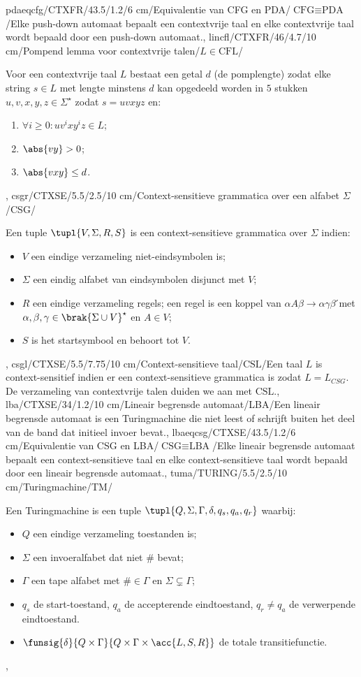 pdaeqcfg/CTXFR/43.5/1.2/6 cm/Equivalentie van CFG en PDA/$\mbox{CFG}\equiv\mbox{PDA}$/{Elke push-down automaat bepaalt een contextvrije taal en elke contextvrije taal wordt bepaald door een push-down automaat.},
lincfl/CTXFR/46/4.7/10 cm/Pompend lemma voor contextvrije talen/$L\in\mbox{CFL}$/{Voor een contextvrije taal $L$ bestaat een getal $d$ (de pomplengte) zodat elke string $s\in L$ met lengte minstens $d$ kan opgedeeld worden in $5$ stukken $u,v,x,y,z\in\Sigma^{\star}$ zodat $s=uvxyz$ en:
\begin{enumerate}
 \item $\forall i\geq 0:uv^ixy^iz\in L$;
 \item $\abs{vy}>0$;
 \item $\abs{vxy}\leq d$.
\end{enumerate}},
csgr/CTXSE/5.5/2.5/10 cm/Context-sensitieve grammatica over een alfabet $\Sigma$/CSG/{Een tuple $\tupl{V,\Sigma,R,S}$ is een context-sensitieve grammatica over $\Sigma$ indien:\begin{itemize}
 \item $V$ een eindige verzameling niet-eindsymbolen is;
 \item $\Sigma$ een eindig alfabet van eindsymbolen disjunct met $V$;
 \item $R$ een eindige verzameling regels; een regel is een koppel van $\alpha A\beta\rightarrow\alpha\gamma\beta$ ́met $\alpha,\beta,\gamma\in\brak{\Sigma\cup V}^{\star}$ en $A\in V$;
 \item $S$ is het startsymbool en behoort tot $V$.
\end{itemize}},
csgl/CTXSE/5.5/7.75/10 cm/Context-sensitieve taal/$\mbox{CSL}$/{Een taal $L$ is context-sensitief indien er een context-sensitieve grammatica is zodat $L=L_{CSG}$. De verzameling van contextvrije talen duiden we aan met $\mbox{CSL}$.},
lba/CTXSE/34/1.2/10 cm/Lineair begrensde automaat/LBA/{Een lineair begrensde automaat is een Turingmachine die niet leest of schrijft buiten het deel van de band dat initieel invoer bevat.},
lbaeqcsg/CTXSE/43.5/1.2/6 cm/Equivalentie van CSG en LBA/$\mbox{CSG}\equiv\mbox{LBA}$/{Elke lineair begrensde automaat bepaalt een context-sensitieve taal en elke context-sensitieve taal wordt bepaald door een lineair begrensde automaat.},
tuma/TURING/5.5/2.5/10 cm/Turingmachine/TM/{Een Turingmachine is een tuple $\tupl{Q,\Sigma,\Gamma,\delta,q_s,q_a,q_r}$ waarbij:\begin{itemize}
 \item $Q$ een eindige verzameling toestanden is;
 \item $\Sigma$ een invoeralfabet dat niet $\#$ bevat;
 \item $\Gamma$ een tape alfabet met $\#\in\Gamma$ en $\Sigma\subsetneq\Gamma$;
 \item $q_s$ de start-toestand, $q_a$ de accepterende eindtoestand, $q_r\neq q_a$ de verwerpende eindtoestand.
 \item $\funsig{\delta}{Q\times\Gamma}{Q\times\Gamma\times\acc{L,S,R}}$ de totale transitiefunctie.
\end{itemize}},
